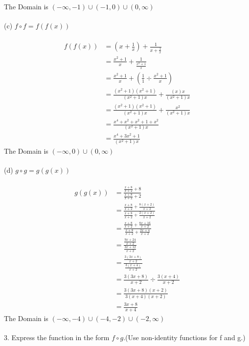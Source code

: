 \documentclass{article}
\begin{document}
The Domain is $(-\infty, -1) \cup (-1, 0) \cup (0, \infty)$\\\\
(c) $f \circ f = f(f(x))$\\\\
\begin{equation}
\begin{split}
    f(f(x)) & = (x + \frac{1}{x}) + \frac{1}{x + \frac{1}{x}}\\
    & = \frac{x^2 + 1}{x} + \frac{1}{\frac{x^2 + 1}{x}}\\
    & = \frac{x^2 + 1}{x} + (\frac{1}{1} \div \frac{x^2 + 1}{x})\\
    & = \frac{(x^2 + 1)(x^2 + 1)}{(x^2 + 1)x} + \frac{(x)x}{(x^2+1)x}\\
    & = \frac{(x^2 + 1)(x^2 + 1)}{(x^2 + 1)x} + \frac{x^2}{(x^2+1)x}\\
    & = \frac{x^4 + x^2 + x^2 + 1 + x^2}{(x^2+1)x}\\
    & = \frac{x^4 + 3x^2 + 1}{(x^2+1)x}
\end{split}
\end{equation}
The Domain is $(-\infty, 0) \cup (0, \infty)$\\\\
(d) $g \circ g = g(g(x))$\\\\
\begin{equation}
\begin{split}
    g(g(x)) & = \frac{\frac{x+8}{x+2} + 8}{\frac{x+8}{x+2} + 2}\\
    & = \frac{\frac{x+8}{x+2} + \frac{8(x+2)}{x+2}}{\frac{x+8}{x+2} + \frac{2(x+2)}{x+2}}\\
    & = \frac{\frac{x+8}{x+2} + \frac{8x+ 16}{x+2}}{\frac{x+8}{x+2} + \frac{2x+4}{x+2}}\\
    & = \frac{\frac{9x + 24}{x+2}}{\frac{3x + 12}{x+2}}\\
    & = \frac{\frac{3(3x + 8)}{x+2}}{\frac{3(x + 4)}{x+2}}\\
    & = \frac{3(3x + 8)}{x+2} \div \frac{3(x + 4)}{x+2}\\
    & = \frac{3(3x + 8)(x+2)}{3(x + 4)(x+2)}\\
    & = \frac{3x + 8}{x+4}
\end{split}
\end{equation}
The Domain is $(-\infty, -4) \cup (-4, -2) \cup (-2, \infty)$\\\\
3. Express the function in the form $f \circ g$.(Use non-identity functions for f and g.)\\\\
\end{document}
